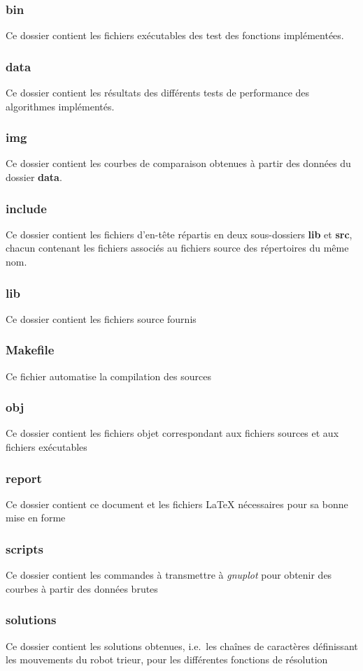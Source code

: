 \documentclass[12pt,a4paper]{article}
\begin{document}
\subsubsection*{bin}
Ce dossier contient les fichiers ex\'ecutables des test des fonctions 
impl\'ement\'ees.
\subsubsection*{data}
Ce dossier contient les r\'esultats des diff\'erents tests de performance des 
algorithmes impl\'ement\'es.
\subsubsection*{img}
Ce dossier contient les courbes de comparaison obtenues \`a partir des donn\'ees 
du dossier {\bfseries data}.
\subsubsection*{include}
Ce dossier contient les fichiers d'en-t\^ete r\'epartis en deux sous-dossiers 
{\bfseries lib} et {\bfseries src}, chacun contenant les fichiers associ\'es au 
fichiers source des r\'epertoires du m\^eme nom.
\subsubsection*{lib}
Ce dossier contient les fichiers source fournis 
\subsubsection*{Makefile}
Ce fichier automatise la compilation des sources
\subsubsection*{obj}
Ce dossier contient les fichiers objet correspondant aux fichiers sources et aux 
fichiers ex\'ecutables
\subsubsection*{report}
Ce dossier contient ce document et les fichiers \LaTeX{} n\'ecessaires pour sa 
bonne mise en forme 
\subsubsection*{scripts}
Ce dossier contient les commandes \`a transmettre \`a {\itshape gnuplot} pour 
obtenir des courbes \`a partir des donn\'ees brutes
\subsubsection*{solutions}
Ce dossier contient les solutions obtenues, i.e.\ les cha\^ines de caract\`eres 
d\'efinissant les mouvements du robot trieur, pour les diff\'erentes fonctions 
de r\'esolution
\end{document}
